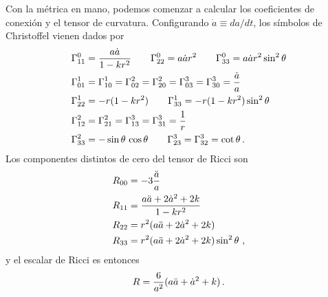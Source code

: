 \documentclass[11pt,b5paper,openany,twoside]{book}
\begin{document}
Con la métrica en mano, podemos comenzar a calcular los coeficientes de conexión y el tensor de curvatura.
Configurando $\dot a\equiv da/dt$, los símbolos de Christoffel vienen dados por
\begin{align}
\Gamma^0_{11}  &=  {{a\dot a}\over{1-kr^2}}\qquad
\Gamma^0_{22} = a\dot a r^2
\qquad \Gamma^0_{33} = a\dot a r^2\sin^2\theta \notag \\
\Gamma^1_{01}  &=  \Gamma^1_{10} = \Gamma^2_{02}= \Gamma^2_{20}
= \Gamma^3_{03}= \Gamma^3_{30}={{\dot a}\over a} \notag \\
\Gamma^1_{22}  &=  -r(1-kr^2) \qquad
\Gamma^1_{33} = -r(1-kr^2)\sin^2\theta \notag \\
\Gamma^2_{12}  &=  \Gamma^2_{21} = \Gamma^3_{13} = \Gamma^3_{31} =
{1\over r} \notag \\
\Gamma^2_{33}  &=  -\sin\theta\,\cos\theta \qquad
\Gamma^3_{23} = \Gamma^3_{32} = \cot\theta\,.\label{8.12}
\end{align}
Los componentes distintos de cero del tensor de Ricci son
\begin{align}
R_{00}  &=  -3{{\ddot a}\over a} \notag \\
R_{11}  &=  {{a\ddot a + 2\dot a^2 +2k}\over{1-kr^2}} \notag \\
R_{22}  &=  r^2(a\ddot a+ 2\dot a^2 +2k) \notag \\
R_{33}  &=  r^2(a\ddot a+ 2\dot a^2 +2k)\sin^2\theta \ ,\label{8.13}
\end{align}
y el escalar de Ricci es entonces
\begin{equation}
R = {{6}\over{a^2}}(a\ddot a+ \dot a^2 +k)\,.\label{8.14}
\end{equation}
\end{document}
